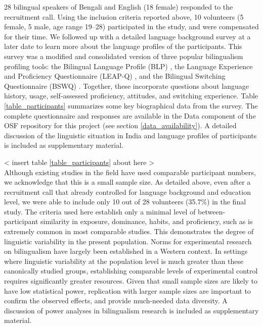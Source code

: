\documentclass[12 pt]{article}
\begin{document}
28 bilingual speakers of Bengali and English (18 female) responded to the recruitment call. Using the inclusion criteria reported above, 10 volunteers (5 female, 5 male, age range 19--28) participated in the study, and were compensated for their time. We followed up with a detailed language background survey at a later date to learn more about the language profiles of the participants. This survey was a modified and consolidated version of three popular bilingualism profiling tools: the Bilingual Language Profile (BLP) \citep{blp}, the Language Experience and Proficiency Questionnaire (LEAP-Q) \citep{leap-q}, and the Bilingual Switching Questionnaire (BSWQ) \citep{language_switching_questionnaire}. Together, these incorporate questions about language history, usage, self-assessed proficiency, attitudes, and switching experience. Table \ref{table_participants} summarizes some key biographical data from the survey. The complete questionnaire and responses are available in the Data component of the OSF repository for this project (see section \ref{data_availability}). A detailed discussion of the linguistic situation in India and language profiles of participants is included as supplementary material.

< insert table \ref{table_participants} about here >\\

Although existing studies in the field have used comparable participant numbers, we acknowledge that this is a small sample size. As detailed above, even after a recruitment call that already controlled for language background and education level, we were able to include only 10 out of 28 volunteers (35.7\%) in the final study. The criteria used here establish only a minimal level of between-participant similarity in exposure, dominance, habits, and proficiency, such as is extremely common in most comparable studies. This demonstrates the degree of linguistic variability in the present population. Norms for experimental research on bilingualism have largely been established in a Western context. In settings where linguistic variability at the population level is much greater than these canonically studied groups, establishing comparable levels of experimental control requires significantly greater resources. Given that small sample sizes are likely to have low statistical power, replication with larger sample sizes are important to confirm the observed effects, and provide much-needed data diversity. A discussion of power analyses in bilingualism research is included as supplementary material. %
\end{document}
